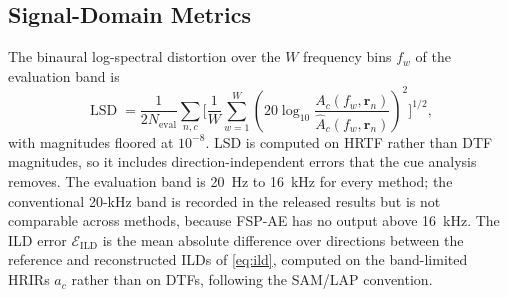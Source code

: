 \documentclass[journal]{IEEEtran}
\begin{document}
\subsection{Signal-Domain Metrics}
The binaural log-spectral distortion over the \(W\) frequency bins \(f_w\) of the evaluation band is
\begin{equation}
\operatorname{LSD}
=\frac{1}{2N_{\mathrm{eval}}}
\sum_{n,c}\Biggl[
\frac{1}{W}\sum_{w=1}^{W}
\left(
20\log_{10}
\frac{A_c(f_w,\mathbf{r}_n)}
{\widehat{A}_c(f_w,\mathbf{r}_n)}
\right)^2\Biggr]^{1/2},
\end{equation}
with magnitudes floored at \(10^{-8}\). LSD is computed on HRTF rather than DTF magnitudes, so it includes direction-independent errors that the cue analysis removes. The evaluation band is 20~Hz to 16~kHz for every method; the conventional 20-kHz band is recorded in the released results but is not comparable across methods, because FSP-AE has no output above 16~kHz. The ILD error \(\mathcal E_{\mathrm{ILD}}\) is the mean absolute difference over directions between the reference and reconstructed ILDs of \eqref{eq:ild}, computed on the band-limited HRIRs \(a_c\) rather than on DTFs, following the SAM/LAP convention.
\end{document}

